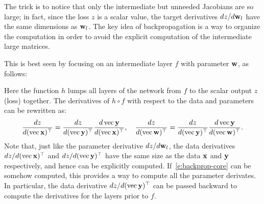 The trick is to notice that only the intermediate but unneeded Jacobians are so large; in fact, since the loss $z$ is a scalar value, the target derivatives $dz / d\mathbf{w}_l$ have the same dimensions as $\mathbf{w}_l$. The key idea of backpropagation is a way to organize the computation in order to avoid the explicit computation of the intermediate large matrices.

This is best seen by focusing on an intermediate layer $f$ with parameter $\mathbf{w}$, as follows:
\begin{center}
\end{center}
Here the function $h$ lumps all layers of the network from $f$ to the scalar output $z$ (loss) together. The derivatives of $h \circ f$ with respect to the data and parameters can be rewritten as:
\begin{equation}\label{e:backprop-core}
\frac{dz}{d(\operatorname{vec} \mathbf{x})^\top}
=
\frac{dz}{d(\operatorname{vec} \mathbf{y})^\top}
\frac{d\operatorname{vec} \mathbf{y}}{d(\operatorname{vec} \mathbf{x})^\top},
\quad
\frac{dz}{d(\operatorname{vec} \mathbf{w})^\top}
=
\frac{dz}{d(\operatorname{vec} \mathbf{y})^\top}
\frac{d\operatorname{vec} \mathbf{y}}{d(\operatorname{vec} \mathbf{w})^\top}.
\end{equation}
Note that, just like the parameter derivative $dz / d\mathbf{w}_l$, the data derivatives $dz /d(\operatorname{vec} \mathbf{x})^\top$ and $dz / d(\operatorname{vec} \mathbf{y})^\top$ have the same size as the data $\mathbf{x}$ and $\mathbf{y}$ respectively, and hence can be explicitly computed. If~\eqref{e:backprop-core} can be somehow computed, this provides a way to compute all the parameter derivates. In particular, the data derivative $dz / d(\operatorname{vec} \mathbf{y})^\top$ can be passed backward to compute the derivatives for the layers prior to $f$.

